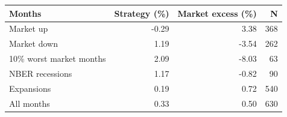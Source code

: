 \begin{tabular}{lrrr}
\toprule
Months & Strategy (\%) & Market excess (\%) & N \\
\midrule
Market up & -0.29 & 3.38 & 368 \\
Market down & 1.19 & -3.54 & 262 \\
10\% worst market months & 2.09 & -8.03 & 63 \\
NBER recessions & 1.17 & -0.82 & 90 \\
Expansions & 0.19 & 0.72 & 540 \\
All months & 0.33 & 0.50 & 630 \\
\bottomrule
\end{tabular}
